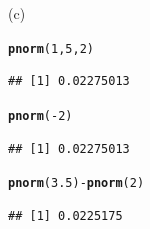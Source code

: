\documentclass[bigtut]{tutorial}\usepackage[]{graphicx}\usepackage[]{color}
\makeatletter
\newcommand{\hlnum}[1]{\textcolor[rgb]{0.686,0.059,0.569}{#1}}%
\newcommand{\hlopt}[1]{\textcolor[rgb]{0,0,0}{#1}}%
\newcommand{\hlstd}[1]{\textcolor[rgb]{0.345,0.345,0.345}{#1}}%
\newcommand{\hlkwd}[1]{\textcolor[rgb]{0.737,0.353,0.396}{\textbf{#1}}}%
\newenvironment{kframe}{%
 \def\at@end@of@kframe{}%
 \ifinner\ifhmode%
  \def\at@end@of@kframe{\end{minipage}}%
  \begin{minipage}{\columnwidth}%
 \fi\fi%
 \def\FrameCommand##1{\hskip\@totalleftmargin \hskip-\fboxsep
 \colorbox{shadecolor}{##1}\hskip-\fboxsep
     \hskip-\linewidth \hskip-\@totalleftmargin \hskip\columnwidth}%
 \MakeFramed {\advance\hsize-\width
   \@totalleftmargin\z@ \linewidth\hsize
   \@setminipage}}%
 {\par\unskip\endMakeFramed%
 \at@end@of@kframe}
\newenvironment{knitrout}{}{} %
\makeatother
\begin{document}
\begin{tutorial}
\begin{questions}
\begin{solution}
(c)
\begin{knitrout}
\color{fgcolor}\begin{kframe}
\begin{alltt}
\hlkwd{pnorm}\hlstd{(}\hlnum{1}\hlstd{,}\hlnum{5}\hlstd{,}\hlnum{2}\hlstd{)}
\end{alltt}
\begin{verbatim}
## [1] 0.02275013
\end{verbatim}
\begin{alltt}
\hlkwd{pnorm}\hlstd{(}\hlopt{-}\hlnum{2}\hlstd{)}
\end{alltt}
\begin{verbatim}
## [1] 0.02275013
\end{verbatim}
\begin{alltt}
\hlkwd{pnorm}\hlstd{(}\hlnum{3.5}\hlstd{)}\hlopt{-}\hlkwd{pnorm}\hlstd{(}\hlnum{2}\hlstd{)}
\end{alltt}
\begin{verbatim}
## [1] 0.0225175
\end{verbatim}
\end{kframe}
\end{knitrout}
\end{solution}


\end{questions}
\end{tutorial}
\end{document}
